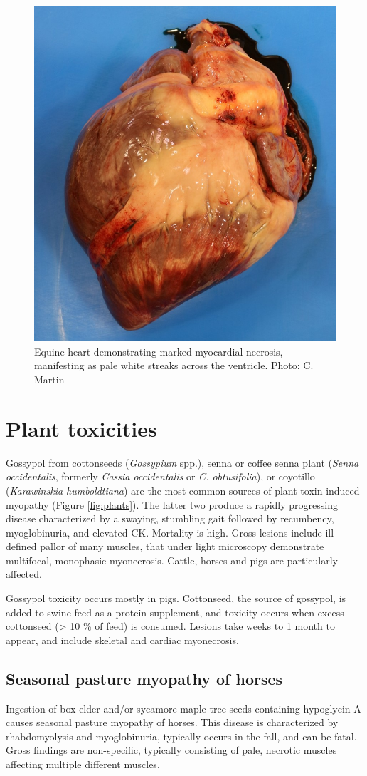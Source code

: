\documentclass[openany]{book}
\begin{document}
\begin{figure}

{\centering \includegraphics[width=0.3\linewidth]{images/heart-necrosis-2} 

}

\caption{Equine heart demonstrating marked myocardial necrosis, manifesting as pale white streaks across the ventricle. Photo: C. Martin}\label{fig:heart-necrosis2}
\end{figure}

\section{Plant toxicities}\label{plant-toxicities}

Gossypol from cottonseeds (\emph{Gossypium} spp.), senna or coffee senna
plant (\emph{Senna occidentalis}, formerly \emph{Cassia occidentalis} or
\emph{C. obtusifolia}), or coyotillo (\emph{Karawinskia humboldtiana})
are the most common sources of plant toxin-induced myopathy (Figure
\ref{fig:plants}). The latter two produce a rapidly progressing disease
characterized by a swaying, stumbling gait followed by recumbency,
myoglobinuria, and elevated CK. Mortality is high. Gross lesions include
ill-defined pallor of many muscles, that under light microscopy
demonstrate multifocal, monophasic myonecrosis. Cattle, horses and pigs
are particularly affected.

Gossypol toxicity occurs mostly in pigs. Cottonseed, the source of
gossypol, is added to swine feed as a protein supplement, and toxicity
occurs when excess cottonseed (\textgreater{} 10 \% of feed) is
consumed. Lesions take weeks to 1 month to appear, and include skeletal
and cardiac myonecrosis.

\subsection{Seasonal pasture myopathy of
horses}\label{seasonal-pasture-myopathy-of-horses}

Ingestion of box elder and/or sycamore maple tree seeds containing
hypoglycin A causes seasonal pasture myopathy of horses. This disease is
characterized by rhabdomyolysis and myoglobinuria, typically occurs in
the fall, and can be fatal. Gross findings are non-specific, typically
consisting of pale, necrotic muscles affecting multiple different
muscles.
\end{document}
